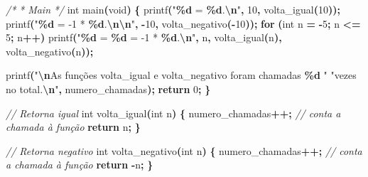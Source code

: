 \documentclass[
  11pt,
  a4paper,
]{scrbook}
\newenvironment{Shaded}{\begin{snugshade}}{\end{snugshade}}
\newcommand{\CommentTok}[1]{\textcolor[rgb]{0.56,0.35,0.01}{\textit{#1}}}
\newcommand{\ControlFlowTok}[1]{\textcolor[rgb]{0.13,0.29,0.53}{\textbf{#1}}}
\newcommand{\DataTypeTok}[1]{\textcolor[rgb]{0.13,0.29,0.53}{#1}}
\newcommand{\DecValTok}[1]{\textcolor[rgb]{0.00,0.00,0.81}{#1}}
\newcommand{\NormalTok}[1]{#1}
\newcommand{\OperatorTok}[1]{\textcolor[rgb]{0.81,0.36,0.00}{\textbf{#1}}}
\newcommand{\SpecialCharTok}[1]{\textcolor[rgb]{0.81,0.36,0.00}{\textbf{#1}}}
\newcommand{\StringTok}[1]{\textcolor[rgb]{0.31,0.60,0.02}{#1}}
\begin{document}
\begin{Shaded}
\begin{Highlighting}[]
\CommentTok{/*}
\CommentTok{ * Main}
\CommentTok{ */}
\DataTypeTok{int}\NormalTok{ main}\OperatorTok{(}\DataTypeTok{void}\OperatorTok{)} \OperatorTok{\{}
\NormalTok{    printf}\OperatorTok{(}\StringTok{"}\SpecialCharTok{\%d}\StringTok{ = }\SpecialCharTok{\%d}\StringTok{.}\SpecialCharTok{\textbackslash{}n}\StringTok{"}\OperatorTok{,} \DecValTok{10}\OperatorTok{,}\NormalTok{ volta\_igual}\OperatorTok{(}\DecValTok{10}\OperatorTok{));}
\NormalTok{    printf}\OperatorTok{(}\StringTok{"}\SpecialCharTok{\%d}\StringTok{ = {-}1 * }\SpecialCharTok{\%d}\StringTok{.}\SpecialCharTok{\textbackslash{}n\textbackslash{}n}\StringTok{"}\OperatorTok{,} \OperatorTok{{-}}\DecValTok{10}\OperatorTok{,}\NormalTok{ volta\_negativo}\OperatorTok{({-}}\DecValTok{10}\OperatorTok{));}
    \ControlFlowTok{for} \OperatorTok{(}\DataTypeTok{int}\NormalTok{ n }\OperatorTok{=} \OperatorTok{{-}}\DecValTok{5}\OperatorTok{;}\NormalTok{ n }\OperatorTok{\textless{}=} \DecValTok{5}\OperatorTok{;}\NormalTok{ n}\OperatorTok{++)}
\NormalTok{        printf}\OperatorTok{(}\StringTok{"}\SpecialCharTok{\%d}\StringTok{ = }\SpecialCharTok{\%d}\StringTok{ = {-}1 * }\SpecialCharTok{\%d}\StringTok{.}\SpecialCharTok{\textbackslash{}n}\StringTok{"}\OperatorTok{,}\NormalTok{ n}\OperatorTok{,}\NormalTok{ volta\_igual}\OperatorTok{(}\NormalTok{n}\OperatorTok{),}\NormalTok{ volta\_negativo}\OperatorTok{(}\NormalTok{n}\OperatorTok{));}

\NormalTok{    printf}\OperatorTok{(}\StringTok{"}\SpecialCharTok{\textbackslash{}n}\StringTok{As funções volta\_igual e volta\_negativo foram chamadas }\SpecialCharTok{\%d}\StringTok{ "}
           \StringTok{"vezes no total.}\SpecialCharTok{\textbackslash{}n}\StringTok{"}\OperatorTok{,}\NormalTok{ numero\_chamadas}\OperatorTok{);}
    \ControlFlowTok{return} \DecValTok{0}\OperatorTok{;}
\OperatorTok{\}}

\CommentTok{// Retorna igual}
\DataTypeTok{int}\NormalTok{ volta\_igual}\OperatorTok{(}\DataTypeTok{int}\NormalTok{ n}\OperatorTok{)} \OperatorTok{\{}
\NormalTok{    numero\_chamadas}\OperatorTok{++;}  \CommentTok{// conta a chamada à função}
    \ControlFlowTok{return}\NormalTok{ n}\OperatorTok{;}
\OperatorTok{\}}

\CommentTok{// Retorna negativo}
\DataTypeTok{int}\NormalTok{ volta\_negativo}\OperatorTok{(}\DataTypeTok{int}\NormalTok{ n}\OperatorTok{)} \OperatorTok{\{}
\NormalTok{    numero\_chamadas}\OperatorTok{++;}  \CommentTok{// conta a chamada à função}
    \ControlFlowTok{return} \OperatorTok{{-}}\NormalTok{n}\OperatorTok{;}
\OperatorTok{\}}
\end{Highlighting}
\end{Shaded}
\end{document}
